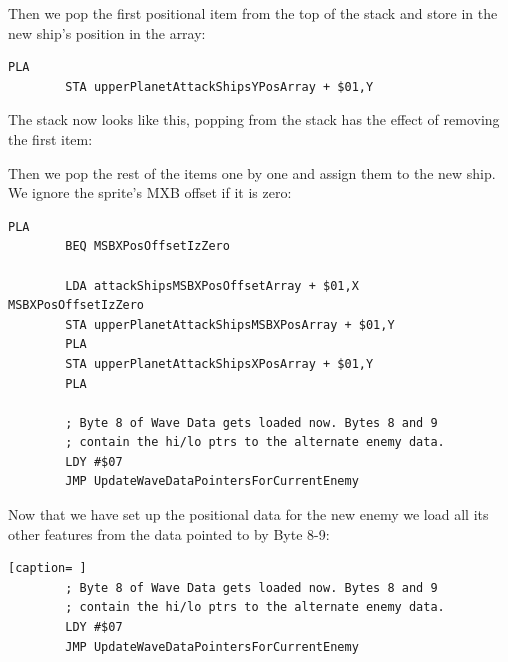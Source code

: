 Then we pop the first positional item  from the top of the stack and store in the new
ship's position in the array:

\begin{lstlisting}[caption="\icode{PLA} remove the top item from the stack and stores it in \icode{A}]
        PLA
        STA upperPlanetAttackShipsYPosArray + $01,Y
\end{lstlisting}

The stack now looks like this, popping from the stack has the effect of removing the first item:

\begin{figure}[H]
  {
    \setlength{\tabcolsep}{3.0pt}
    \setlength\cmidrulewidth{\heavyrulewidth} %
    \begin{adjustbox}{width=10cm,center}
    \end{adjustbox}

  }
\end{figure}

Then we pop the rest of the items one by one and assign them to the new ship. We ignore the sprite's MXB offset if it is
zero:
\begin{lstlisting}[caption=\icode{PLA} remove the top item from the stack and stores it in \icode{A}.]
        PLA
        BEQ MSBXPosOffsetIzZero

        LDA attackShipsMSBXPosOffsetArray + $01,X
MSBXPosOffsetIzZero   
        STA upperPlanetAttackShipsMSBXPosArray + $01,Y
        PLA
        STA upperPlanetAttackShipsXPosArray + $01,Y
        PLA

        ; Byte 8 of Wave Data gets loaded now. Bytes 8 and 9
        ; contain the hi/lo ptrs to the alternate enemy data.
        LDY #$07
        JMP UpdateWaveDataPointersForCurrentEnemy
\end{lstlisting}

Now that we have set up the positional data for the new enemy we load all its other features from the data pointed
to by Byte 8-9:

\begin{lstlisting}[caption= ]
        ; Byte 8 of Wave Data gets loaded now. Bytes 8 and 9
        ; contain the hi/lo ptrs to the alternate enemy data.
        LDY #$07
        JMP UpdateWaveDataPointersForCurrentEnemy
\end{lstlisting}

